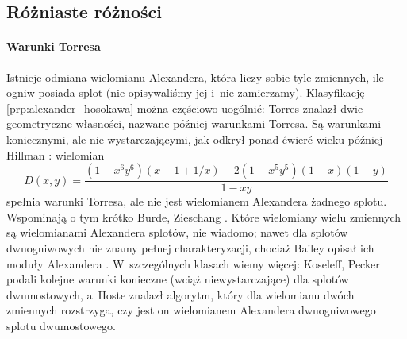 
\subsection{Różniaste różności}
\paragraph{Warunki Torresa}
Istnieje odmiana wielomianu Alexandera, która liczy sobie tyle zmiennych, ile ogniw posiada splot (nie opisywaliśmy jej i~nie zamierzamy).
Klasyfikację \ref{prp:alexander_hosokawa} można częściowo uogólnić: Torres \cite{torres1953} znalazł dwie geometryczne własności, nazwane później warunkami Torresa.
%
%
Są warunkami koniecznymi, ale nie wystarczającymi, jak odkrył ponad ćwierć wieku później Hillman \cite{hillman1981}: wielomian
%
\begin{equation}
    D(x,y) = \frac{(1 - x^6y^6)(x - 1 + 1/x) - 2(1 - x^5y^5)(1 - x)(1 - y)}{1-xy}
\end{equation}
spełnia warunki Torresa, ale nie jest wielomianem Alexandera żadnego splotu.
Wspominają o tym krótko Burde, Zieschang \cite[s. 150]{burde2014}.
Które wielomiany wielu zmiennych są wielomianami Alexandera splotów, nie wiadomo; nawet dla splotów dwuogniwowych nie znamy pełnej charakteryzacji, chociaż Bailey \cite{bailey1977} opisał ich moduły Alexandera \cite[problem 1.8]{baykur2026}.
%
W~szczególnych klasach wiemy więcej: Koseleff, Pecker \cite{koseleff2015} podali kolejne warunki konieczne (wciąż niewystarczające) dla splotów dwumostowych, a~Hoste \cite{hoste2020} znalazł algorytm, który dla wielomianu dwóch zmiennych rozstrzyga, czy jest on wielomianem Alexandera dwuogniwowego splotu dwumostowego.
%
%
%

